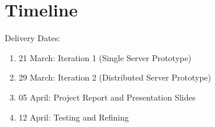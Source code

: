 
\section{Timeline}
\label{sec:timeline}

Delivery Dates:
\begin{enumerate}[topsep=2pt,itemsep=-1ex,partopsep=1ex,parsep=1ex]
	\item 21 March: Iteration 1 (Single Server Prototype)
	\item 29 March: Iteration 2 (Distributed Server Prototype)
	\item 05 April: Project Report and Presentation Slides
	\item 12 April: Testing and Refining
\end{enumerate}